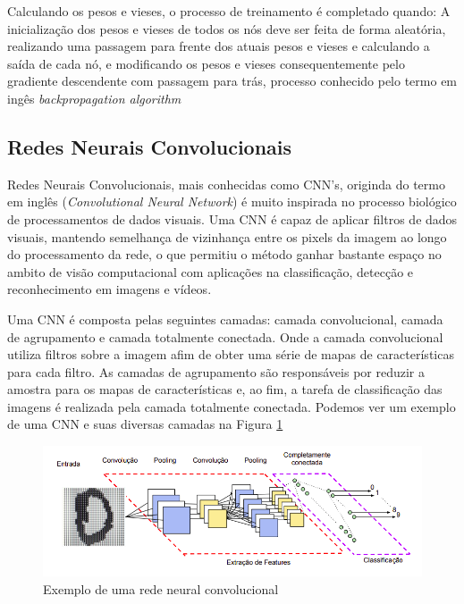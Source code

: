 Calculando os pesos e vieses, o processo de treinamento é completado quando: A inicialização dos pesos e vieses de todos os nós deve ser feita de forma aleatória, realizando uma passagem para frente dos atuais pesos e vieses e calculando a saída de cada nó, e modificando os pesos e vieses consequentemente pelo gradiente descendente com passagem para trás, processo conhecido pelo termo em ingês \emph{backpropagation algorithm} \cite{rna3}


\subsection{Redes Neurais Convolucionais}

Redes Neurais Convolucionais, mais conhecidas como CNN's, originda do termo em inglês (\emph{Convolutional Neural Network}) é muito inspirada no processo biológico de processamentos de dados visuais. Uma CNN é capaz de aplicar filtros de dados visuais, mantendo semelhança de vizinhança entre os pixels da imagem ao longo do processamento da rede, o que permitiu o método ganhar bastante espaço no ambito de visão computacional com aplicações na classificação, detecção e reconhecimento em imagens e vídeos. \cite{rnc} 

Uma CNN é composta pelas seguintes camadas: camada convolucional, camada de agrupamento e camada totalmente conectada. Onde a camada convolucional utiliza filtros sobre a imagem  afim de obter uma série de mapas de características para cada filtro. As camadas de agrupamento são responsáveis por reduzir a amostra para os mapas de características e, ao fim, a tarefa de classificação das imagens é realizada pela camada totalmente conectada. \cite{rnc2} Podemos ver um exemplo de uma CNN e suas diversas camadas na Figura \ref{fig_rnc}

\begin{figure}[!h]
	\centering
	\label{fig_rnc}
		\includegraphics[keepaspectratio=true,scale=0.5]{figuras/exemplo_convolucao.png}
	\caption{Exemplo de uma rede neural convolucional \cite{rnc}}
\end{figure}


